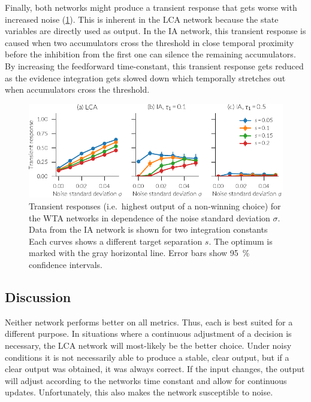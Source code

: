 Finally, both networks might produce a transient response that gets worse with increased noise (\cref{fig:ia-transient}).
This is inherent in the LCA network because the state variables are directly used as output.
In the IA network, this transient response is caused when two accumulators cross the threshold in close temporal proximity before the inhibition from the first one can silence the remaining accumulators.
By increasing the feedforward time-constant, this transient response gets reduced as the evidence integration gets slowed down which temporally stretches out when accumulators cross the threshold.
\begin{figure}
    \centering
    \includegraphics{figures/ia-transient}
    \caption[Transient WTA responses]{Transient responses (i.e.\ highest output of a non-winning choice) for the WTA networks in dependence of the noise standard deviation $\sigma$. Data from the IA network is shown for two integration constants Each curves shows a different target separation $s$. The optimum is marked with the gray horizontal line. Error bars show \SI{95}{\percent} confidence intervals.}\label{fig:ia-transient}
\end{figure}


\subsection{Discussion}
Neither network performs better on all metrics.
Thus, each is best suited for a different purpose.
In situations where a continuous adjustment of a decision is necessary, the LCA network will most-likely be the better choice.
Under noisy conditions it is not necessarily able to produce a stable, clear output, but if a clear output was obtained, it was always correct.
If the input changes, the output will adjust according to the networks time constant and allow for continuous updates.
Unfortunately, this also makes the network susceptible to noise.

